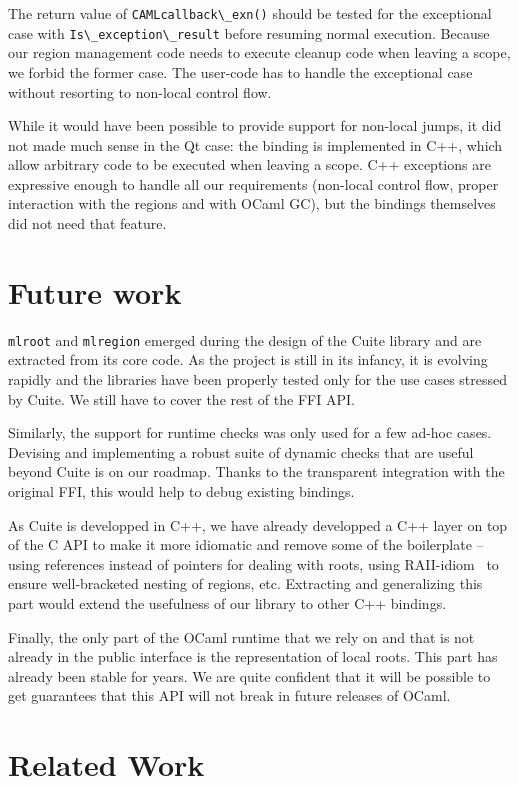\documentclass[a4paper]{easychair}
\newcommand{\cpp}[1]{\lstinline[style=C++]{#1}}
\begin{document}
The return value of \cpp{CAMLcallback\_exn()} should be tested for
the exceptional case with \cpp{Is\_exception\_result} before resuming
normal execution.  Because our region management code needs to execute cleanup
code when leaving a scope, we forbid the former case. The user-code has to
handle the exceptional case without resorting to non-local control flow.

While it would have been possible to provide support for non-local
jumps, it did not made much sense in the Qt case: the binding is
implemented in C++, which allow arbitrary code to be executed when
leaving a scope. C++ exceptions are expressive enough to handle all our
requirements (non-local control flow, proper interaction with the
regions and with OCaml GC), but the bindings themselves did not need
that feature.

\section{Future work}

\cpp{mlroot} and \cpp{mlregion} emerged during the design of the Cuite library
and are extracted from its core code.  As the project is still in its infancy,
it is evolving rapidly and the libraries have been properly tested only for the
use cases stressed by Cuite. We still have to cover the rest of the FFI API.

Similarly, the support for runtime checks was only used for a few ad-hoc
cases. Devising and implementing a robust suite of dynamic checks that are
useful beyond Cuite is on our roadmap. Thanks to the transparent integration
with the original FFI, this would help to debug existing bindings.

As Cuite is developped in C++, we have already developped a C++ layer on top of
the C API to make it more idiomatic and remove some of the boilerplate --
using references instead of pointers for dealing with roots, using
RAII-idiom~\citep{Stroustrup:1995:DEC:193198} to ensure well-bracketed nesting
of regions, etc.
Extracting and generalizing this part would extend the usefulness of our
library to other C++ bindings.

Finally, the only part of the OCaml runtime that we rely on and that is not
already in the public interface is the representation of local roots. 
This part has already been stable for years. We are quite confident that it
will be possible to get guarantees that this API will not break in future
releases of OCaml.

\section{Related Work}
\end{document}
